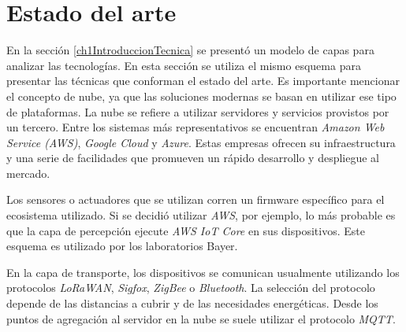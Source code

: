\section{Estado del arte}
\label{ch1EstadoDelArte}

En la sección \ref{ch1IntroduccionTecnica} se presentó un modelo de capas para analizar las tecnologías. En esta sección se utiliza el mismo esquema para presentar las técnicas que conforman el estado del arte.
Es importante mencionar el concepto de nube, ya que las soluciones modernas se basan en utilizar ese tipo de plataformas. La nube se refiere a utilizar servidores y servicios provistos por un tercero. Entre los sistemas más representativos se encuentran \emph{Amazon Web Service (AWS)}, \emph{Google Cloud} y \emph{Azure}. Estas empresas ofrecen su infraestructura y una serie de facilidades que promueven un rápido desarrollo y despliegue al mercado.

Los sensores o actuadores que se utilizan corren un firmware específico para el ecosistema utilizado.
Si se decidió utilizar \emph{AWS}, por ejemplo, lo más probable es que la capa de percepción ejecute \emph{AWS IoT Core} en sus dispositivos.
Este esquema es utilizado por los laboratorios Bayer. \citep{WEBSITE:AWSBayer}

En la capa de transporte, los dispositivos se comunican usualmente utilizando los protocolos \emph{LoRaWAN}, \emph{Sigfox}, \emph{ZigBee} o \emph{Bluetooth}. La selección del protocolo depende de las distancias a cubrir y de las necesidades energéticas. Desde los puntos de agregación al servidor en la nube se suele utilizar el protocolo \emph{MQTT}.



